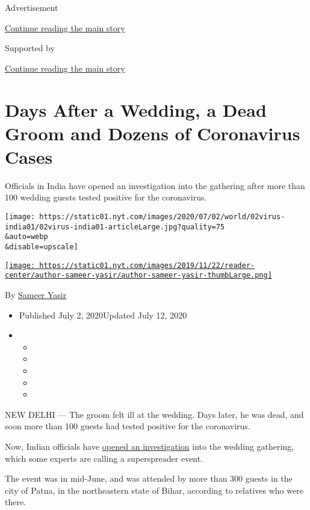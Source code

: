 Advertisement

\protect\hyperlink{after-top}{Continue reading the main story}

Supported by

\protect\hyperlink{after-sponsor}{Continue reading the main story}

\hypertarget{days-after-a-wedding-a-dead-groom-and-dozens-of-coronavirus-cases}{%
\section{Days After a Wedding, a Dead Groom and Dozens of Coronavirus
Cases}\label{days-after-a-wedding-a-dead-groom-and-dozens-of-coronavirus-cases}}

Officials in India have opened an investigation into the gathering after
more than 100 wedding guests tested positive for the coronavirus.

\texttt{[image: https://static01.nyt.com/images/2020/07/02/world/02virus-india01/02virus-india01-articleLarge.jpg?quality=75\\\&auto=webp\\\&disable=upscale]}

\href{https://www.nytimes.com/by/sameer-yasir}{\texttt{[image: https://static01.nyt.com/images/2019/11/22/reader-center/author-sameer-yasir/author-sameer-yasir-thumbLarge.png]}}

By \href{https://www.nytimes.com/by/sameer-yasir}{Sameer Yasir}

\begin{itemize}
\item
  Published July 2, 2020Updated July 12, 2020
\item
  \begin{itemize}
  \item
  \item
  \item
  \item
  \item
  \end{itemize}
\end{itemize}

NEW DELHI --- The groom felt ill at the wedding. Days later, he was
dead, and soon more than 100 guests had tested positive for the
coronavirus.

Now, Indian officials have
\href{https://thewire.in/health/patna-how-a-wedding-led-to-a-funeral-and-100-covid-19-positive-cases}{opened
an investigation} into the wedding gathering, which some experts are
calling a superspreader event.

The event was in mid-June, and was attended by more than 300 guests in
the city of Patna, in the northeastern state of Bihar, according to
relatives who were there.

